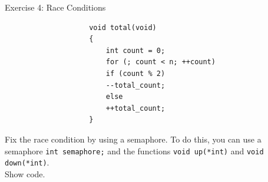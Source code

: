 \documentclass[10pt]{beamer}
\begin{document}
\begin{frame}{Exercise 4: Race Conditions}
\begin{minipage}[t]{0.5\linewidth-2\tabcolsep}
\begin{verbatim}
                    void total(void)
                    {
                        int count = 0;
                        for (; count < n; ++count)
                        if (count % 2)
                        --total_count;
                        else
                        ++total_count;
                    }
                \end{verbatim}
            \end{minipage}
            \framebreak


            Fix the race condition by using a semaphore.
            To do this, you can use a semaphore \texttt{int semaphore;} and the functions \texttt{void up(*int)} and \texttt{void down(*int)}. \\
            \alert{Show code.}


        \end{frame}
\end{document}
